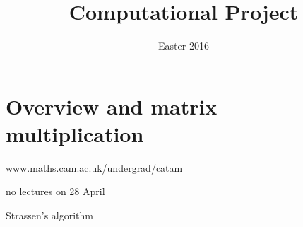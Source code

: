 \documentclass[a4paper]{article}
\begin{document}
\title{Computational Project}
\date{Easter 2016}

\maketitle

\newpage

\tableofcontents

\newpage

\section{Overview and matrix multiplication}
www.maths.cam.ac.uk/undergrad/catam

no lectures on 28 April

\newpage
Strassen's algorithm
\end{document}
